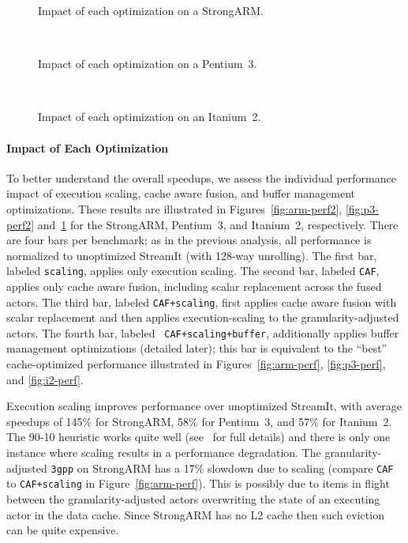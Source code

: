 \begin{figure}[t]
\nocaptionrule
\begin{minipage}{3.35in}
\centering
{}
\vspace{-14pt}
\caption{Impact of each optimization on a StrongARM.\protect\label{fig:arm-perf2}}
~ \\ \vspace{3pt}

\vspace{-14pt}
\caption{Impact of each optimization on a Pentium~3.\protect\label{fig:p3-perf2}}
~ \\ \vspace{3pt}

\vspace{-14pt}
\caption{Impact of each optimization on an Itanium~2.\protect\label{fig:i2-perf2}}
\end{minipage}
\end{figure}

\paragraph*{Impact of Each Optimization}
To better understand the overall speedups, we assess the individual
performance impact of execution scaling, cache aware fusion, and
buffer management optimizations.  These results are illustrated in
Figures~\ref{fig:arm-perf2}, \ref{fig:p3-perf2} and~\ref{fig:i2-perf2}
for the StrongARM, Pentium~3, and Itanium~2, respectively.  There are
four bars per benchmark; as in the previous analysis, all performance
is normalized to unoptimized StreamIt (with 128-way unrolling).  The
first bar, labeled {\tt scaling}, applies only execution scaling.  The
second bar, labeled {\tt CAF}, applies only cache aware fusion,
including scalar replacement across the fused actors.  The third bar,
labeled {\tt CAF+scaling}, first applies cache aware fusion with
scalar replacement and then applies execution-scaling to the
granularity-adjusted actors.  The fourth bar, labeled {\tt
CAF+scaling+buffer}, additionally applies buffer management
optimizations (detailed later); this bar is equivalent to the ``best''
cache-optimized performance illustrated in Figures~\ref{fig:arm-perf},
\ref{fig:p3-perf}, and \ref{fig:i2-perf}.

Execution scaling improves performance over unoptimized StreamIt, with
average speedups of 145\% for StrongARM, 58\% for Pentium~3, and 57\%
for Itanium~2.  The 90-10 heuristic works quite well
(see~\cite{janis-thesis} for full details) and there is only one
instance where scaling results in a performance degradation. The
granularity-adjusted \texttt{3gpp} on StrongARM has a 17\% slowdown
due to scaling (compare {\tt CAF} to {\tt CAF+scaling} in
Figure~\ref{fig:arm-perf}).  This is possibly due to items in flight
between the granularity-adjusted actors overwriting the state of an
executing actor in the data cache.  Since StrongARM has no L2 cache
then such eviction can be quite expensive.

